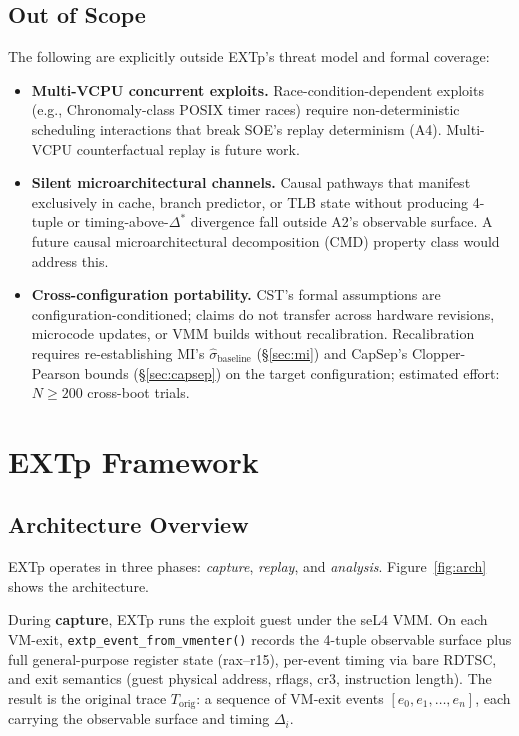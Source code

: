 \documentclass[conference]{IEEEtran}
\newcommand{\Korig}{T_\text{orig}}
\newcommand{\sigbase}{\hat{\sigma}_\text{baseline}}
\newcommand{\Dstar}{\Delta^{*}}
\begin{document}
\subsection*{Out of Scope}

The following are explicitly outside EXTp's threat model and formal
coverage:
\begin{itemize}
\item \textbf{Multi-VCPU concurrent exploits.} Race-condition-dependent
  exploits (e.g., Chronomaly-class POSIX timer races) require
  non-deterministic scheduling interactions that break SOE's replay
  determinism (A4). Multi-VCPU counterfactual replay is future work.
\item \textbf{Silent microarchitectural channels.} Causal pathways
  that manifest exclusively in cache, branch predictor, or TLB state
  without producing 4-tuple or timing-above-$\Dstar$ divergence fall
  outside A2's observable surface. A future causal
  microarchitectural decomposition (CMD) property class would
  address this.
\item \textbf{Cross-configuration portability.} CST's formal
  assumptions are configuration-conditioned; claims do not transfer
  across hardware revisions, microcode updates, or VMM builds without
  recalibration. Recalibration requires re-establishing MI's
  $\sigbase$ (\S\ref{sec:mi}) and CapSep's Clopper-Pearson bounds
  (\S\ref{sec:capsep}) on the target configuration; estimated effort:
  $N \geq 200$ cross-boot trials.
\end{itemize}

\section{EXTp Framework}\label{sec:framework}

\subsection{Architecture Overview}

EXTp operates in three phases: \emph{capture}, \emph{replay}, and
\emph{analysis}. Figure~\ref{fig:arch} shows the architecture.

During \textbf{capture}, EXTp runs the exploit guest under the seL4
VMM. On each VM-exit, \texttt{extp\_event\_from\_vmenter()} records
the 4-tuple observable surface plus full general-purpose register
state (rax--r15), per-event timing via bare RDTSC, and exit semantics
(guest physical address, rflags, cr3, instruction length). The
result is the original trace $\Korig$: a sequence of VM-exit events
$[e_0, e_1, \ldots, e_n]$, each carrying the observable surface and
timing $\Delta_i$.
\end{document}
